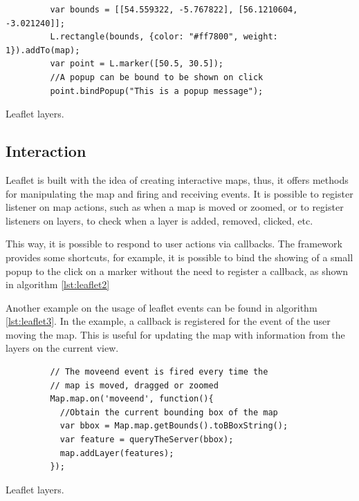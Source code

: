 \begin{listing}\centering
  \begin{minipage}{.7\textwidth}
    \begin{verbatim}
	     var bounds = [[54.559322, -5.767822], [56.1210604, -3.021240]];
	     L.rectangle(bounds, {color: "#ff7800", weight: 1}).addTo(map);
	     var point = L.marker([50.5, 30.5]);
	     //A popup can be bound to be shown on click
	     point.bindPopup("This is a popup message");
    \end{verbatim}
  \end{minipage}
  \caption{Leaflet layers.}\label{lst:leaflet2}
\end{listing}

\subsection*{Interaction}

Leaflet is built with the idea of creating interactive maps, thus, it offers methods for manipulating the map and firing and receiving events. It is possible to register listener on map actions, such as when a map is moved or zoomed, or to register listeners on layers, to check when a layer is added, removed, clicked, etc.

This way, it is possible to respond to user actions via callbacks. The framework provides some shortcuts, for example, it is possible to bind the showing of a small popup to the click on a marker without the need to register a callback, as shown in algorithm \ref{lst:leaflet2}

Another example on the usage of leaflet events can be found in algorithm \ref{lst:leaflet3}. In the example, a callback is registered for the event of the user moving the map. This is useful for updating the map with information from the layers on the current view.

\begin{listing}\centering
  \begin{minipage}{.5\textwidth}
    \begin{verbatim}
	     // The moveend event is fired every time the
	     // map is moved, dragged or zoomed
	     Map.map.on('moveend', function(){
	       //Obtain the current bounding box of the map
	       var bbox = Map.map.getBounds().toBBoxString();
	       var feature = queryTheServer(bbox);
	       map.addLayer(features);
	     });
    \end{verbatim}
  \end{minipage}
  \caption{Leaflet layers.}\label{lst:leaflet3}
\end{listing}


